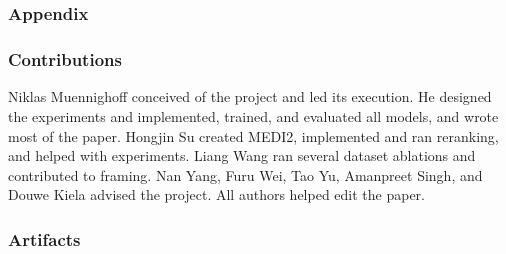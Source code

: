 \documentclass{article}
\begin{document}
\newpage




\newpage
\appendix

\part{}
\section*{\centering \LARGE{Appendix}}
\parttoc

\clearpage

\section{Contributions}
\label{sec:contributions}

Niklas Muennighoff conceived of the project and led its execution. He designed the experiments and implemented, trained, and evaluated all models, and wrote most of the paper. Hongjin Su created MEDI2, implemented and ran reranking, and helped with experiments. Liang Wang ran several dataset ablations and contributed to framing. Nan Yang, Furu Wei, Tao Yu, Amanpreet Singh, and Douwe Kiela advised the project. All authors helped edit the paper.

\section{Artifacts}
\label{sec:artifacts}
\end{document}
